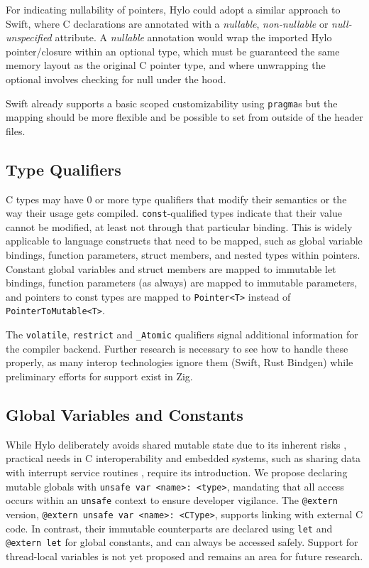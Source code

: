 For indicating nullability of pointers, Hylo could adopt a similar approach to Swift\cite{how-swift-imports-c-nullable}, where C declarations are annotated with a \textit{nullable}, \textit{non-nullable} or \textit{null-unspecified} attribute. A \textit{nullable} annotation would wrap the imported Hylo pointer/closure within an optional type, which must be guaranteed the same memory layout as the original C pointer type, and where unwrapping the optional involves checking for null under the hood.

Swift already supports a basic scoped customizability using \texttt{pragma}s but the mapping should be more flexible and be possible to set from outside of the header files.

\subsection{Type Qualifiers}
C types may have 0 or more type qualifiers that modify their semantics or the way their usage gets compiled. \texttt{const}-qualified types indicate that their value cannot be modified, at least not through that particular binding. This is widely applicable to language constructs that need to be mapped, such as global variable bindings, function parameters, struct members, and nested types within pointers. Constant global variables and struct members are mapped to immutable let bindings, function parameters (as always) are mapped to immutable parameters, and pointers to const types are mapped to \texttt{Pointer<T>} instead of \texttt{PointerToMutable<T>}.

The \texttt{volatile}, \texttt{restrict} and \texttt{\_Atomic} qualifiers signal additional information for the compiler backend. Further research is necessary to see how to handle these properly, as many interop technologies ignore them (Swift, Rust Bindgen) while preliminary efforts for support exist in Zig\cite{zig-qualifiers}.

\subsection{Global Variables and Constants}
While Hylo deliberately avoids shared mutable state due to its inherent risks \cite{sharedmut}\cite{shared-mutable-state}, practical needs in C interoperability and embedded systems, such as sharing data with interrupt service routines \cite{rust-embedded-pain}, require its introduction. We propose declaring mutable globals with \texttt{unsafe var <name>: <type>}, mandating that all access occurs within an \texttt{unsafe} context to ensure developer vigilance. The \texttt{@extern} version, \texttt{@extern unsafe var <name>: <CType>}, supports linking with external C code. In contrast, their immutable counterparts are declared using \texttt{let} and \texttt{@extern let} for global constants, and can always be accessed safely. Support for thread-local variables is not yet proposed and remains an area for future research.

